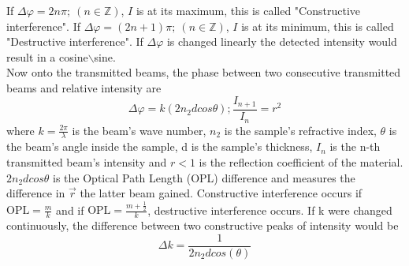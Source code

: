 \documentclass[reprint,amsmath,amssymb,aps, prl]{revtex4-2}
\begin{document}
If $\Delta\varphi=2n\pi;\ (n\in\mathbb{Z})$, $I$ is at its maximum, this is called "Constructive interference". If $\Delta\varphi=(2n+1)\pi;\ (n\in\mathbb{Z})$, $I$ is at its minimum, this is called "Destructive interference". If $\Delta\varphi$ is changed linearly the detected intensity would result in a cosine$\backslash$sine.\\
Now onto the transmitted beams, the phase between two consecutive transmitted beams and relative intensity are
\begin{equation} \label{eq:ThinPhaseAmp}
\Delta\varphi=k(2n_{2}dcos\theta);\frac{I_{n+1}}{I_{n}}=r^{2}
\end{equation}
where $k=\frac{2\pi}{\lambda}$ is the beam's wave number, $n_{2}$ is the sample's refractive index, $\theta$ is the beam's angle inside the sample,  d is the sample's thickness, $I_{n}$ is the n-th transmitted beam's intensity and $r<1$ is the reflection coefficient of the material. $2n_{2}dcos\theta$ is the Optical Path Length (OPL) difference and measures the difference in $\vec{r}$ the latter beam gained. Constructive interference occurs if $\text{OPL}=\frac{m}{k}$ and if $\text{OPL}=\frac{m+\frac{1}{2}}{k}$, destructive interference occurs. If k were changed continuously, the difference between two constructive peaks of intensity would be
\begin{equation} \label{eq:ThinDiffWavenum}
\Delta k=\frac{1}{2n_{2}dcos(\theta)}
\end{equation}

\end{document}
